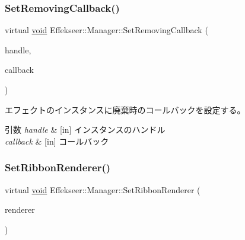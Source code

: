 \mbox{\label{class_effekseer_1_1_manager_a62c24747994008dfcb84a0adcd53b3ad}} 
\subsubsection{\texorpdfstring{Set\+Removing\+Callback()}{SetRemovingCallback()}}
{\footnotesize\ttfamily virtual \mbox{\hyperlink{namespace_effekseer_ab34c4088e512200cf4c2716f168deb56}{void}} Effekseer\+::\+Manager\+::\+Set\+Removing\+Callback (\begin{DoxyParamCaption}\item[{\mbox{\hyperlink{namespace_effekseer_afba58b8d812da862190e9bbfc040824a}{Handle}}}]{handle,  }\item[{Effect\+Instance\+Removing\+Callback}]{callback }\end{DoxyParamCaption})\hspace{0.3cm}{\ttfamily [pure virtual]}}



エフェクトのインスタンスに廃棄時のコールバックを設定する。 


\begin{DoxyParams}{引数}
{\em handle} & \mbox{[}in\mbox{]} インスタンスのハンドル \\
\hline
{\em callback} & \mbox{[}in\mbox{]} コールバック \\
\hline
\end{DoxyParams}
\mbox{\label{class_effekseer_1_1_manager_afe6fa26d93c9c80a0afb8f4fbe0afe20}} 
\subsubsection{\texorpdfstring{Set\+Ribbon\+Renderer()}{SetRibbonRenderer()}}
{\footnotesize\ttfamily virtual \mbox{\hyperlink{namespace_effekseer_ab34c4088e512200cf4c2716f168deb56}{void}} Effekseer\+::\+Manager\+::\+Set\+Ribbon\+Renderer (\begin{DoxyParamCaption}\item[{\mbox{\hyperlink{class_effekseer_1_1_ribbon_renderer}{Ribbon\+Renderer}} $\ast$}]{renderer }\end{DoxyParamCaption})\hspace{0.3cm}{\ttfamily [pure virtual]}}



